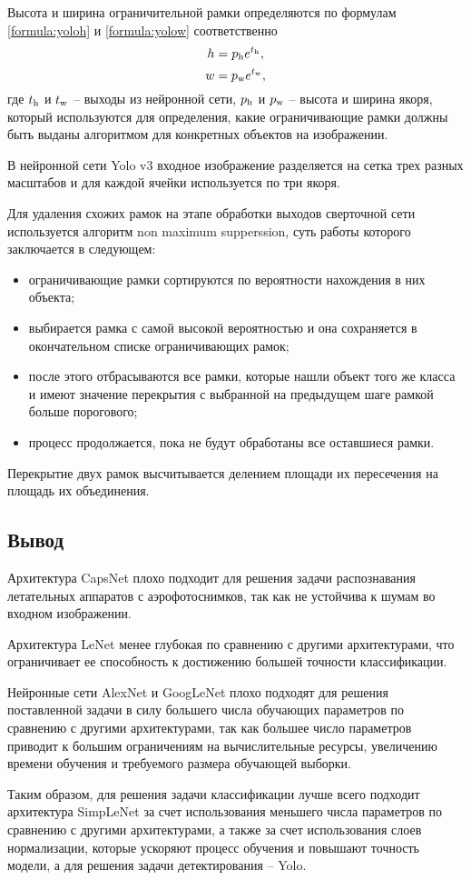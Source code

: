 Высота и ширина ограничительной рамки определяются по формулам \ref{formula:yoloh} и \ref{formula:yolow} соответственно
\begin{equation}\label{formula:yoloh}
h =  p_{\rm{h}}e^{t_{\rm{h}}},
\end{equation}
\begin{equation}\label{formula:yolow}
w =  p_{\rm{w}}e^{t_{\rm{w}}},
\end{equation}
где $t_{\rm{h}}$ и $t_{\rm{w}}$ -- выходы из нейронной сети, $p_{\rm{h}}$ и $p_{\rm{w}}$ -- высота и ширина якоря, который используются для определения, какие ограничивающие рамки должны быть выданы алгоритмом для конкретных объектов на изображении.

В нейронной сети Yolo v3 входное изображение разделяется на сетка трех разных масштабов и для каждой ячейки используется по три якоря.

Для удаления схожих рамок на этапе обработки выходов сверточной сети используется алгоритм non maximum supperssion, суть работы которого заключается в следующем:
\begin{itemize}
	\item ограничивающие рамки сортируются по вероятности нахождения в них объекта;
	\item выбирается рамка с самой высокой вероятностью и она сохраняется в окончательном списке ограничивающих рамок;
	\item после этого отбрасываются все рамки, которые нашли объект того же класса и имеют значение перекрытия с выбранной на предыдущем шаге рамкой больше порогового;
	\item процесс продолжается, пока не будут обработаны все оставшиеся рамки.
\end{itemize}

Перекрытие двух рамок высчитывается делением площади их пересечения на площадь их объединения.


\subsection{Вывод}
Архитектура CapsNet плохо подходит для решения задачи распознавания летательных аппаратов с аэрофотоснимков, так как не устойчива к шумам во входном изображении.

Архитектура LeNet менее глубокая по сравнению с другими архитектурами, что ограничивает ее способность к достижению большей точности классификации.

Нейронные сети AlexNet и GoogLeNet плохо подходят для решения поставленной задачи в силу большего числа обучающих параметров по сравнению с другими архитектурами, так как большее число параметров приводит к большим ограничениям на вычислительные ресурсы, увеличению времени обучения и требуемого размера обучающей выборки.

Таким образом, для решения задачи классификации лучше всего подходит архитектура SimpLeNet за счет использования меньшего числа параметров по сравнению с другими архитектурами, а также за счет использования слоев нормализации, которые ускоряют процесс обучения и повышают точность модели, а для решения задачи детектирования -- Yolo.